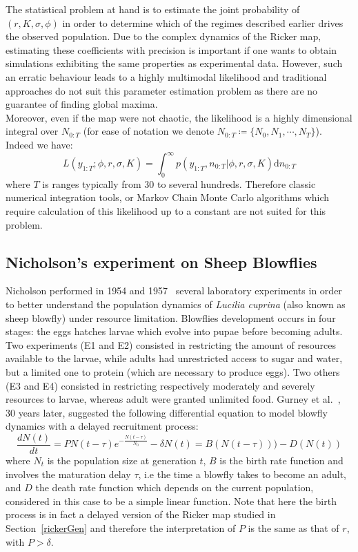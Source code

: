 \documentclass[12pt]{article}
\begin{document}
	The statistical problem at hand is to estimate the joint probability of $(r, K, \sigma, \phi)$ in order to determine which of the regimes described earlier drives the observed population. Due to the complex dynamics of the Ricker map, estimating these coefficients with precision is important if one wants to obtain simulations exhibiting the same properties as experimental data. However, such an erratic behaviour leads to a highly multimodal likelihood and traditional approaches do not suit this parameter estimation problem as there are no guarantee of finding global maxima. \\
	Moreover, even if the map were not chaotic, the likelihood is a highly dimensional integral over $N_{0:T}$ (for ease of notation we denote $N_{0:T} \coloneqq \{N_0, N_1, \cdots, N_T\}$). Indeed we have:
	\begin{equation}
	L(y_{1:T}; \phi, r, \sigma, K) = \int_{0}^{\infty}p(y_{1:T}, n_{0:T} | \phi, r, \sigma, K)\mathrm{d}n_{0:T}
	\end{equation}
	where $T$ is ranges typically from 30 to several hundreds. Therefore classic numerical integration tools, or Markov Chain Monte Carlo algorithms which require calculation of this likelihood up to a constant are not suited for this problem. 
	
	\subsection{Nicholson's experiment on Sheep Blowflies} \label{Nicholson}
	Nicholson performed in 1954 and 1957~\cite{nicholson1954outline, nicholson1957self} several
	laboratory experiments in order to better understand the population dynamics of \emph{Lucilia cuprina} (also known as sheep blowfly)
	under resource limitation. Blowflies development occurs in four stages: the eggs hatches larvae which evolve into pupae before becoming adults. Two experiments  (E1 and E2) consisted in restricting the amount of resources available to the larvae, while adults had unrestricted access to sugar and water, but a limited one to protein (which are necessary to produce eggs). Two others (E3 and E4) consisted in restricting respectively moderately and severely resources to larvae, whereas adult were granted unlimited food. Gurney et al.~\cite{gurney1980nicholson}, 30 years later, suggested the following differential equation to model blowfly dynamics with a delayed recruitment process:
	\begin{equation} \label{blow}
		\frac{d N(t)}{d t} = PN(t-\tau)e^{-\frac{N(t-\tau)}{N_0}} -  \delta N(t) = B(N(t-\tau))) - D(N(t))
	\end{equation} 
	where $N_t$ is the population size at generation $t$, $B$ is the birth rate function and involves the maturation delay $\tau$, i.e the time a blowfly takes to become an adult, and $D$ the death rate function which depends on the current population, considered in this case to be a simple linear function. Note that here the birth process is in fact a delayed version of the Ricker map studied in Section~\ref{rickerGen} and therefore the interpretation of $P$ is the same as that of $r$, with $P > \delta$.
	
\end{document}
